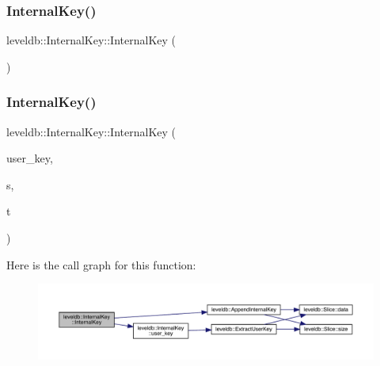 \subsubsection{\texorpdfstring{InternalKey()}{InternalKey()}\hspace{0.1cm}{\footnotesize\ttfamily [1/2]}}
{\footnotesize\ttfamily leveldb\+::\+Internal\+Key\+::\+Internal\+Key (\begin{DoxyParamCaption}{ }\end{DoxyParamCaption})\hspace{0.3cm}{\ttfamily [inline]}}

\mbox{\label{classleveldb_1_1_internal_key_af436814d1667db55e93b6bd583619617}} 
\subsubsection{\texorpdfstring{InternalKey()}{InternalKey()}\hspace{0.1cm}{\footnotesize\ttfamily [2/2]}}
{\footnotesize\ttfamily leveldb\+::\+Internal\+Key\+::\+Internal\+Key (\begin{DoxyParamCaption}\item[{const \mbox{\hyperlink{classleveldb_1_1_slice}{Slice}} \&}]{user\+\_\+key,  }\item[{\mbox{\hyperlink{namespaceleveldb_a5481ededd221c36d652c371249f869fa}{Sequence\+Number}}}]{s,  }\item[{\mbox{\hyperlink{namespaceleveldb_acc038cb0d608414730cafa459a4ba866}{Value\+Type}}}]{t }\end{DoxyParamCaption})\hspace{0.3cm}{\ttfamily [inline]}}

Here is the call graph for this function\+:
\nopagebreak
\begin{figure}[H]
\begin{center}
\leavevmode
\includegraphics[width=350pt]{classleveldb_1_1_internal_key_af436814d1667db55e93b6bd583619617_cgraph}
\end{center}
\end{figure}


